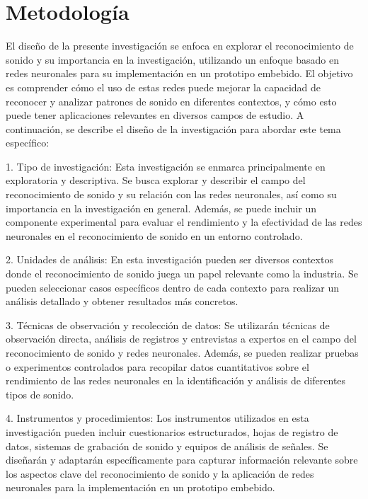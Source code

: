 \chapter{Metodología}
El diseño de la presente investigación se enfoca en explorar el reconocimiento de sonido y su importancia en la investigación, utilizando un enfoque basado en redes neuronales para su implementación en un prototipo embebido. El objetivo es comprender cómo el uso de estas redes puede mejorar la capacidad de reconocer y analizar patrones de sonido en diferentes contextos, y cómo esto puede tener aplicaciones relevantes en diversos campos de estudio. A continuación, se describe el diseño de la investigación para abordar este tema específico:

1. Tipo de investigación: Esta investigación se enmarca principalmente en exploratoria y descriptiva. Se busca explorar y describir el campo del reconocimiento de sonido y su relación con las redes neuronales, así como su importancia en la investigación en general. Además, se puede incluir un componente experimental para evaluar el rendimiento y la efectividad de las redes neuronales en el reconocimiento de sonido en un entorno controlado.

2. Unidades de análisis: En esta investigación pueden ser diversos contextos donde el reconocimiento de sonido juega un papel relevante como la industria. Se pueden seleccionar casos específicos dentro de cada contexto para realizar un análisis detallado y obtener resultados más concretos.

3. Técnicas de observación y recolección de datos: Se utilizarán técnicas de observación directa, análisis de registros y entrevistas a expertos en el campo del reconocimiento de sonido y redes neuronales. Además, se pueden realizar pruebas o experimentos controlados para recopilar datos cuantitativos sobre el rendimiento de las redes neuronales en la identificación y análisis de diferentes tipos de sonido.

4. Instrumentos y procedimientos: Los instrumentos utilizados en esta investigación pueden incluir cuestionarios estructurados, hojas de registro de datos, sistemas de grabación de sonido y equipos de análisis de señales. Se diseñarán y adaptarán específicamente para capturar información relevante sobre los aspectos clave del reconocimiento de sonido y la aplicación de redes neuronales para la implementación en un prototipo embebido.


